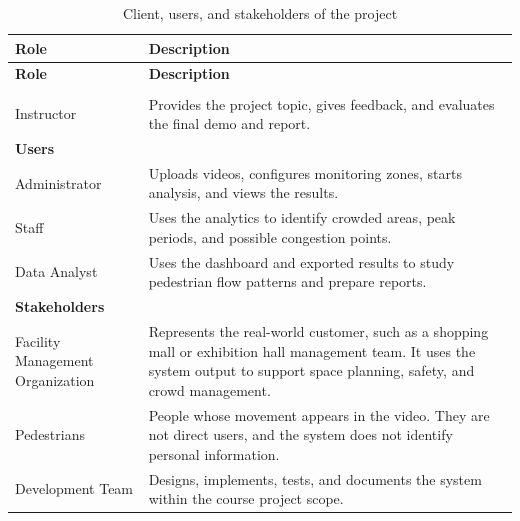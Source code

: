 \documentclass[12pt,a4paper]{report}
\begin{document}
\begin{longtable}{|p{4.0cm}|p{10.5cm}|}
\caption{Client, users, and stakeholders of the project}
\label{tab:client-users-stakeholders} \\
\hline
\rowcolor{HeaderBlue}
\textbf{Role} & \textbf{Description} \\
\hline
\endfirsthead

\hline
\rowcolor{HeaderBlue}
\textbf{Role} & \textbf{Description} \\
\hline
\endhead

\hline
\endfoot

\hline
\endlastfoot

\multicolumn{2}{|l|}{\cellcolor{HeaderBlue!35}\textbf{Client}} \\
\hline

Instructor 
& Provides the project topic, gives feedback, and evaluates the final demo and report. \\
\hline

\multicolumn{2}{|l|}{\cellcolor{HeaderBlue!35}\textbf{Users}} \\
\hline

Administrator 
& Uploads videos, configures monitoring zones, starts analysis, and views the results. \\
\hline

Staff 
& Uses the analytics to identify crowded areas, peak periods, and possible congestion points. \\
\hline

Data Analyst 
& Uses the dashboard and exported results to study pedestrian flow patterns and prepare reports. \\
\hline

\multicolumn{2}{|l|}{\cellcolor{HeaderBlue!35}\textbf{Stakeholders}} \\
\hline

Facility Management Organization 
& Represents the real-world customer, such as a shopping mall or exhibition hall management team. 
It uses the system output to support space planning, safety, and crowd management. \\
\hline

Pedestrians 
& People whose movement appears in the video. 
They are not direct users, and the system does not identify personal information. \\
\hline

Development Team 
& Designs, implements, tests, and documents the system within the course project scope. \\
\hline

\end{longtable}
\end{document}
